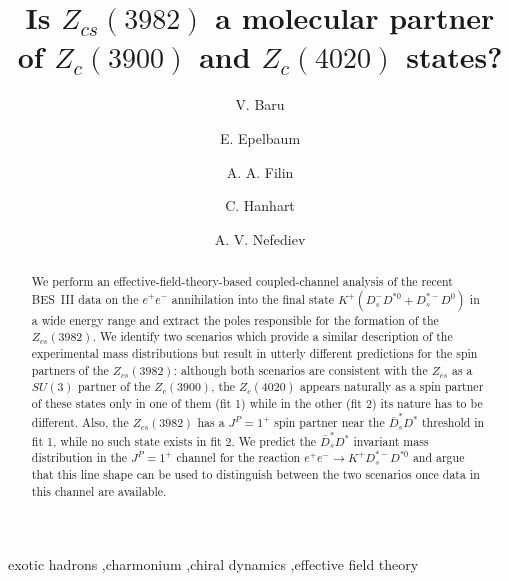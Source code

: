 \documentclass[preprint,12pt,3p]{elsarticle}
\begin{document}
\begin{frontmatter}

\title{Is $Z_{cs}(3982)$ a molecular partner of $Z_c(3900)$ and $Z_c(4020)$ states?}


\author[1,2]{V. Baru}
\author[1]{E. Epelbaum}
\author[1]{A. A. Filin}
\author[3]{C. Hanhart}
\author[4,5]{A. V. Nefediev}

\address[1]{Institut f\"ur Theoretische Physik II, Ruhr-Universit\"at Bochum, D-44780 Bochum, Germany}
\address[2]{Institute for Theoretical and Experimental Physics NRC ``Kurchatov Institute'', Moscow 117218, Russia}
\address[3]{Institute for Advanced Simulation, Institut f\"ur Kernphysik and\\ J\"ulich Center for Hadron Physics, Forschungszentrum J\"ulich, D-52425 J\"ulich, Germany}
\address[4]{P.N. Lebedev Physical Institute of the Russian Academy of Sciences, 119991, Leninskiy Prospect 53, Moscow, Russia}
\address[5]{Moscow Institute of Physics and Technology, 141700, 9 Institutsky lane, Dolgoprudny, Moscow Region, Russia}

\begin{abstract}
We perform an effective-field-theory-based coupled-channel analysis of the recent BES~III data on the $e^+e^-$ annihilation into the final state $K^+(D_s^-D^{*0}+D_s^{*-}D^0)$ in a wide energy range and extract the poles responsible for the formation of the $Z_{cs}(3982)$. We identify two scenarios which provide a similar description of the experimental mass distributions but result in utterly different predictions for the spin partners of the $Z_{cs}(3982)$: although both scenarios are consistent with the $Z_{cs}$ as a $SU(3)$ partner of the $Z_c(3900)$, the $Z_c(4020)$ appears naturally as a spin partner of these states only in one of them (fit 1) while in the other (fit 2) its nature has to be different. Also, the $Z_{cs}(3982)$ has a $J^{P}=1^+$ spin partner near the $\bar D_s^* D^*$ threshold in fit 1, while no such state exists in fit 2. We predict the $\bar{D}_s^*D^*$ invariant mass distribution in the $J^{P}=1^+$ channel
for the reaction $e^+e^-\to K^+D_s^{*-}D^{*0}$ and argue that this line shape can be used to distinguish between the two scenarios once data in this channel are available. 
\end{abstract}

\begin{keyword}
exotic hadrons \sep charmonium \sep chiral dynamics \sep effective field theory
\end{keyword}

\end{frontmatter}
\end{document}
